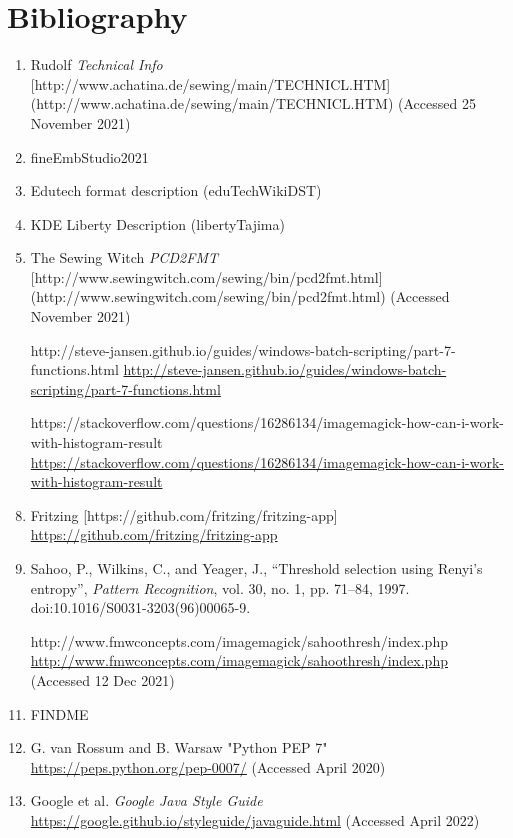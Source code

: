 \documentclass{report}
\begin{document}
\section{Bibliography}

\begin{enumerate}
\item Rudolf \emph{Technical Info} [http://www.achatina.de/sewing/main/TECHNICL.HTM](http://www.achatina.de/sewing/main/TECHNICL.HTM)
(Accessed 25 November 2021)
\item fineEmbStudio2021
\item Edutech format description (eduTechWikiDST)
\item KDE Liberty Description (libertyTajima)
\item The Sewing Witch \emph{PCD2FMT} [http://www.sewingwitch.com/sewing/bin/pcd2fmt.html](http://www.sewingwitch.com/sewing/bin/pcd2fmt.html) (Accessed November 2021)
\item [http://steve-jansen.github.io/guides/windows-batch-scripting/part-7-functions.html] \url{http://steve-jansen.github.io/guides/windows-batch-scripting/part-7-functions.html}
\item [https://stackoverflow.com/questions/16286134/imagemagick-how-can-i-work-with-histogram-result] \url{https://stackoverflow.com/questions/16286134/imagemagick-how-can-i-work-with-histogram-result}
\item Fritzing [https://github.com/fritzing/fritzing-app] \url{https://github.com/fritzing/fritzing-app}
\item Sahoo, P., Wilkins, C., and Yeager, J., “Threshold selection using Renyi's entropy”, \emph{Pattern Recognition}, vol. 30, no. 1, pp. 71–84, 1997. doi:10.1016/S0031-3203(96)00065-9.
\item [http://www.fmwconcepts.com/imagemagick/sahoothresh/index.php]
\url{http://www.fmwconcepts.com/imagemagick/sahoothresh/index.php} (Accessed 12 Dec 2021)
\item FINDME
\item G. van Rossum and B. Warsaw "Python PEP 7" \url{https://peps.python.org/pep-0007/} (Accessed April 2020)
\item Google et al. \emph{Google Java Style Guide} \url{https://google.github.io/styleguide/javaguide.html} (Accessed April 2022)
\end{enumerate}





\appendix



\printindex
\end{document}
